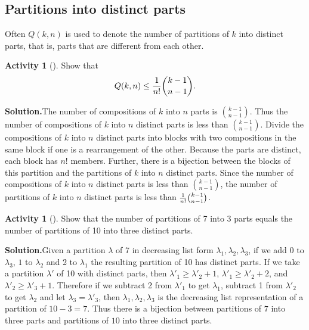 \documentclass[10pt,]{book}
\theoremstyle{plain}
\theoremstyle{definition}
\newtheorem{activity}[project]{Activity}
\numberwithin{equation}{chapter}
\begin{document}
\subsection[{Partitions into distinct parts}]{Partitions into distinct parts}\label{subsection-16}
Often \(Q(k,n)\) is used to denote the number of partitions of \(k\) into distinct parts, that is, parts that are different from each other.%
\begin{activity}[]\label{activity-58}
Show that%
\begin{equation*}
Q(k,n) \le {1\over n!}{k-1\choose n-1}.
\end{equation*}
%
\par\medskip\noindent%
\textbf{Solution.}\quad The number of compositions of \(k\) into \(n\) parts is \(k-1\choose n-1\). Thus the number of compositions of \(k\) into \(n\) distinct parts is less than \(k-1\choose n-1\). Divide the compositions of \(k\) into \(n\) distinct parts into blocks with two compositions in the same block if one is a rearrangement of the other. Because the parts are distinct, each block has \(n!\) members. Further, there is a bijection between the blocks of this partition and the partitions of \(k\) into \(n\) distinct parts. Since the number of compositions of \(k\) into \(n\) distinct parts is less than \(k-1 \choose n-1\), the number of partitions of \(k\) into \(n\) distinct parts is less than \({1\over n!}
{k-1\choose n-1}\).%
\end{activity}
\begin{activity}[]\label{activity-59}
Show that the number of partitions of 7 into 3 parts equals the number of partitions of 10 into three distinct parts.%
\par\medskip\noindent%
\textbf{Solution.}\quad Given a partition \(\lambda\) of 7 in decreasing list form \(\lambda_1,\lambda_2,\lambda_3\), if we add 0 to \(\lambda_3\), \(1\) to \(\lambda_2\) and 2 to \(\lambda_1\) the resulting partition of 10 has distinct parts. If we take a partition \(\lambda'\) of 10 with distinct parts, then \(\lambda'_1\ge\lambda'_2+1\), \(\lambda'_1\ge\lambda'_2+2\), and \(\lambda'_2\ge \lambda'_3+1\). Therefore if we subtract 2 from \(\lambda'_1\) to get \(\lambda_1\), subtract 1 from \(\lambda'_2\) to get \(\lambda_2\) and let \(\lambda_3= \lambda'_3\), then \(\lambda_1,\lambda_2,\lambda_3\) is the decreasing list representation of a partition of \(10-3=7\). Thus there is a bijection between partitions of \(7\) into three parts and partitions of \(10\) into three distinct parts.%
\end{activity}
\end{document}
